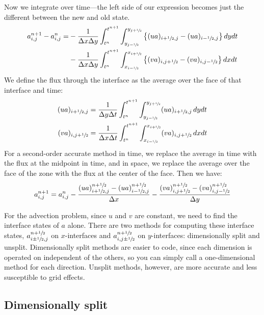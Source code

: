Now we integrate over time---the left side of our expression becomes
just the different between the new and old state.
\begin{align}
 a_{i,j}^{n+1} - a_{i,j}^n = 
  &- \frac{1}{\Delta x\Delta y} \int_{t^n}^{t^{n+1}} \int_{y_{j-\sfrac{1}{2}}}^{y_{j+\sfrac{1}{2}}}
     \left \{ (u a)_{i+\sfrac{1}{2},j} - (u a)_{i-\sfrac{1}{2},j} \right \} dy dt \nonumber \\
  &- \frac{1}{\Delta x\Delta y} \int_{t^n}^{t^{n+1}} \int_{x_{i-\sfrac{1}{2}}}^{x_{i+\sfrac{1}{2}}}
     \left \{ (v a)_{i,j+\sfrac{1}{2}} - (v a)_{i,j-\sfrac{1}{2}} \right \} dx dt
\label{eq:update2du}
\end{align}
We define the flux through the interface as the average over the face
of that interface and time: 
\begin{align}
(ua)_{i+\sfrac{1}{2},j} &= \frac{1}{\Delta y \Delta t}
    \int_{t^n}^{t^{n+1}} \int_{y_{j-\sfrac{1}{2}}}^{y_{j+\sfrac{1}{2}}} (ua)_{i+\sfrac{1}{2},j}\, dy dt  \\
(va)_{i,j+\sfrac{1}{2}} &= \frac{1}{\Delta x \Delta t}
    \int_{t^n}^{t^{n+1}} \int_{x_{i-\sfrac{1}{2}}}^{x_{i+\sfrac{1}{2}}} (va)_{i,j+\sfrac{1}{2}}\, dx dt 
\end{align}
For a second-order accurate method in time, we replace the average in
time with the flux at the midpoint in time, and in space, we replace
the average over the face of the zone with the flux at the center of the face.  Then we have:
\begin{equation}
a_{i,j}^{n+1} = a_{i,j}^n - 
   \frac{(ua)_{i+\sfrac{1}{2},j}^{n+\sfrac{1}{2}} - (ua)_{i-\sfrac{1}{2},j}^{n+\sfrac{1}{2}}}{\Delta x} -
   \frac{(va)_{i,j+\sfrac{1}{2}}^{n+\sfrac{1}{2}} - (va)_{i,j-\sfrac{1}{2}}^{n+\sfrac{1}{2}}}{\Delta y}
\end{equation}

For the advection problem, since $u$ and $v$ are constant, we need
to find the interface states of $a$ alone.
There are two methods for computing these interface states, 
$a_{i\pm\sfrac{1}{2},j}^{n+\sfrac{1}{2}}$ on $x$-interfaces and  $a_{i,j\pm\sfrac{1}{2}}^{n+\sfrac{1}{2}}$ on $y$-interfaces:
dimensionally split and unsplit.  Dimensionally split methods are
easier to code, since each dimension is operated on independent of the
others, so you can simply call a one-dimensional method for each
direction.  Unsplit methods, however, are more accurate and less
susceptible to grid effects.  

\subsection{Dimensionally split}


